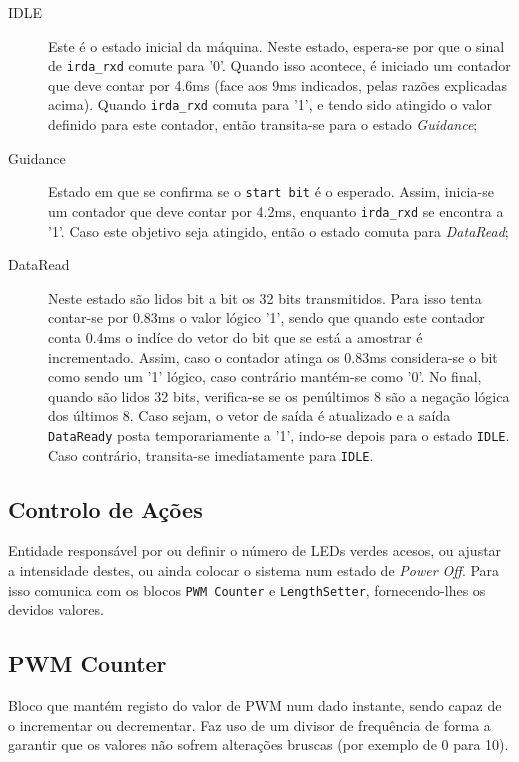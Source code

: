 \documentclass[a4paper,11pt,openright,oneside]{report}
\begin{document}
\begin{description}
\item[IDLE] Este é o estado inicial da máquina. Neste estado, espera-se por que o sinal de \verb|irda_rxd| comute para '0'. Quando isso acontece, é iniciado um contador que deve contar por 4.6ms (face aos 9ms indicados, pelas razões explicadas acima). Quando \verb|irda_rxd| comuta para '1', e tendo sido atingido o valor definido para este contador, então transita-se para o estado \textit{Guidance};
\item[Guidance] Estado em que se confirma se o \texttt{start bit} é o esperado. Assim, inicia-se um contador que deve contar por 4.2ms, enquanto \verb|irda_rxd| se encontra a '1'. Caso este objetivo seja atingido, então o estado comuta para \textit{DataRead};
\item[DataRead] Neste estado são lidos bit a bit os 32 bits transmitidos. Para isso tenta contar-se por 0.83ms o valor lógico '1', sendo que quando este contador conta 0.4ms o indíce do vetor do bit que se está a amostrar é incrementado. Assim, caso o contador atinga os 0.83ms considera-se o bit como sendo um '1' lógico, caso contrário mantém-se como '0'. No final, quando são lidos 32 bits, verifica-se se os penúltimos 8 são a negação lógica dos últimos 8. Caso sejam, o vetor de saída é atualizado e a saída \verb|DataReady| posta temporariamente a '1', indo-se depois para o estado \verb|IDLE|. Caso contrário, transita-se imediatamente para \verb|IDLE|.
\end{description}

\subsection*{Controlo de Ações}

Entidade responsável por ou definir o número de LEDs verdes acesos, ou ajustar a intensidade destes, ou ainda colocar o sistema num estado de \textit{Power Off}. Para isso comunica com os blocos \verb|PWM Counter| e \verb|LengthSetter|, fornecendo-lhes os devidos valores.

\subsection*{PWM Counter}

Bloco que mantém registo do valor de PWM num dado instante, sendo capaz de o incrementar ou decrementar. Faz uso de um divisor de frequência de forma a garantir que os valores não sofrem alterações bruscas (por exemplo de 0 para 10).
\end{document}

